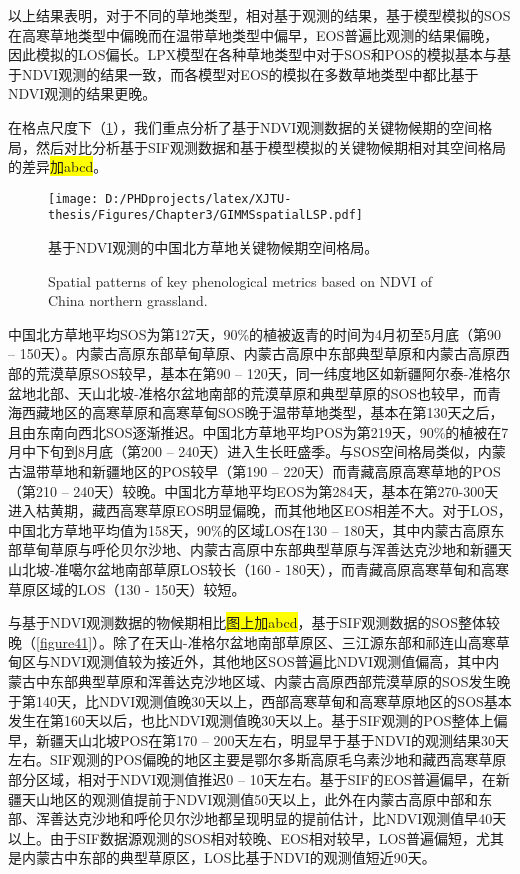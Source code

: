以上结果表明，对于不同的草地类型，相对基于观测的结果，基于模型模拟的SOS在高寒草地类型中偏晚而在温带草地类型中偏早，EOS普遍比观测的结果偏晚，因此模拟的LOS偏长。LPX模型在各种草地类型中对于SOS和POS的模拟基本与基于NDVI观测的结果一致，而各模型对EOS的模拟在多数草地类型中都比基于NDVI观测的结果更晚。

在格点尺度下（\cref{figure40}），我们重点分析了基于NDVI观测数据的关键物候期的空间格局，然后对比分析基于SIF观测数据和基于模型模拟的关键物候期相对其空间格局的差异\colorbox{yellow}{加abcd}。

\begin{figure}[h]
  \centering
  \texttt{[image: D:/PHDprojects/latex/XJTU-thesis/Figures/Chapter3/GIMMSspatialLSP.pdf]}
  \caption{基于NDVI观测的中国北方草地关键物候期空间格局。}
  \addtocounter{figure}{-1}
  \vspace{5pt}
  \renewcommand{\figurename}{Fig}
  \caption{Spatial patterns of key phenological metrics based on NDVI of China northern grassland.}
  \label{figure40}
\end{figure}

中国北方草地平均SOS为第127天，90\%的植被返青的时间为4月初至5月底（第90 – 150天）。内蒙古高原东部草甸草原、内蒙古高原中东部典型草原和内蒙古高原西部的荒漠草原SOS较早，基本在第90 – 120天，同一纬度地区如新疆阿尔泰-准格尔盆地北部、天山北坡-准格尔盆地南部的荒漠草原和典型草原的SOS也较早，而青海西藏地区的高寒草原和高寒草甸SOS晚于温带草地类型，基本在第130天之后，且由东南向西北SOS逐渐推迟。中国北方草地平均POS为第219天，90\%的植被在7月中下旬到8月底（第200 – 240天）进入生长旺盛季。与SOS空间格局类似，内蒙古温带草地和新疆地区的POS较早（第190 – 220天）而青藏高原高寒草地的POS（第210 – 240天）较晚。中国北方草地平均EOS为第284天，基本在第270-300天进入枯黄期，藏西高寒草原EOS明显偏晚，而其他地区EOS相差不大。对于LOS，中国北方草地平均值为158天，90\%的区域LOS在130 – 180天，其中内蒙古高原东部草甸草原与呼伦贝尔沙地、内蒙古高原中东部典型草原与浑善达克沙地和新疆天山北坡-准噶尔盆地南部草原LOS较长（160 - 180天），而青藏高原高寒草甸和高寒草原区域的LOS（130 - 150天）较短。

与基于NDVI观测数据的物候期相比\colorbox{yellow}{图上加abcd}，基于SIF观测数据的SOS整体较晚（\cref{figure41}）。除了在天山-准格尔盆地南部草原区、三江源东部和祁连山高寒草甸区与NDVI观测值较为接近外，其他地区SOS普遍比NDVI观测值偏高，其中内蒙古中东部典型草原和浑善达克沙地区域、内蒙古高原西部荒漠草原的SOS发生晚于第140天，比NDVI观测值晚30天以上，西部高寒草甸和高寒草原地区的SOS基本发生在第160天以后，也比NDVI观测值晚30天以上。基于SIF观测的POS整体上偏早，新疆天山北坡POS在第170 – 200天左右，明显早于基于NDVI的观测结果30天左右。SIF观测的POS偏晚的地区主要是鄂尔多斯高原毛乌素沙地和藏西高寒草原部分区域，相对于NDVI观测值推迟0 – 10天左右。基于SIF的EOS普遍偏早，在新疆天山地区的观测值提前于NDVI观测值50天以上，此外在内蒙古高原中部和东部、浑善达克沙地和呼伦贝尔沙地都呈现明显的提前估计，比NDVI观测值早40天以上。由于SIF数据源观测的SOS相对较晚、EOS相对较早，LOS普遍偏短，尤其是内蒙古中东部的典型草原区，LOS比基于NDVI的观测值短近90天。

